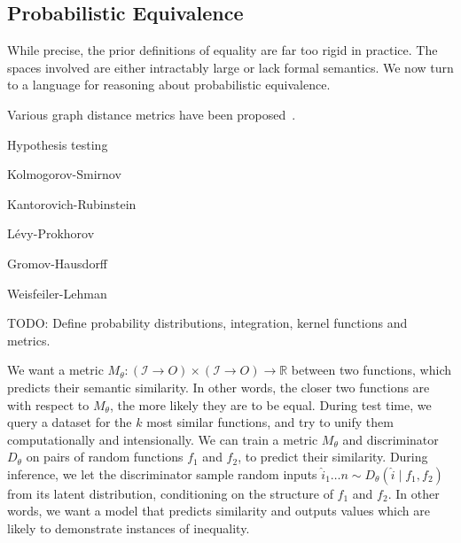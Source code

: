 \documentclass[11pt]{article}
\begin{document}



    \subsection{Probabilistic Equivalence}\label{sec:probabilistic}

    While precise, the prior definitions of equality are far too rigid in practice. The spaces involved are either intractably large or lack formal semantics. We now turn to a language for reasoning about probabilistic equivalence.



    Various graph distance metrics have been proposed~\citet{sanfeliu1983distance}.

    Hypothesis testing

    Kolmogorov-Smirnov

    Kantorovich-Rubinstein

    L\'evy-Prokhorov

    Gromov-Hausdorff

    Weisfeiler-Lehman

    TODO: Define probability distributions, integration, kernel functions and metrics.

    We want a metric $M_\theta: (\mathcal{I}\rightarrow{O}) \times (\mathcal{I}\rightarrow{O})\rightarrow \mathbb{R}$ between two functions, which predicts their semantic similarity. In other words, the closer two functions are with respect to $M_\theta$, the more likely they are to be equal. During test time, we query a dataset for the $k$ most similar functions, and try to unify them computationally and intensionally. We can train a metric $M_\theta$ and discriminator $D_\theta$ on pairs of random functions $f_1$ and $f_2$, to predict their similarity. During inference, we let the discriminator sample random inputs $\hat i_1 \ldots n \sim D_\theta(\hat i \mid f_1, f_2)$ from its latent distribution, conditioning on the structure of $f_1$ and $f_2$. In other words, we want a model that predicts similarity and outputs values which are likely to demonstrate instances of inequality.
\end{document}
